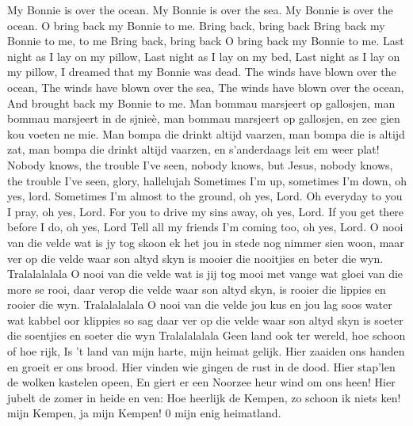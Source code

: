 \documentclass{article}
\begin{document}
\begin{songs}{}
\endsong 
{}
\beginverse*
My Bonnie is over the ocean.
My Bonnie is over the sea.
My Bonnie is over the ocean.
O bring back my Bonnie to me.
\endverse
\beginchorus
Bring back, bring back
Bring back my Bonnie to me, to me
Bring back, bring back
O bring back my Bonnie to me.
\endchorus
\beginverse*
Last night as I lay on my pillow,
Last night as I lay on my bed,
Last night as I lay on my pillow,
I dreamed that my Bonnie was dead.
\endverse
\beginverse*
The winds have blown over the ocean,
The winds have blown over the sea,
The winds have blown over the ocean,
And brought back my Bonnie to me.
\endverse
\beginverse*
Man bommau marsjeert op gallosjen,
man bommau marsjeert in de sjnieè,
man  bommau marsjeert op gallosjen,
en zee gien kou voeten ne mie.
\endverse
\beginverse*
Man bompa die drinkt altijd vaarzen,
man bompa die is altijd zat, 
man bompa die drinkt altijd vaarzen,
en s’anderdaags leit em weer plat!
\endverse
\endsong 
{}
\beginverse*
Nobody knows, the trouble I’ve seen,
nobody knows, but Jesus,
nobody knows, the trouble I’ve seen,
glory, hallelujah
\endverse
\beginverse*
Sometimes I’m up, sometimes I’m down,
oh yes, lord.
Sometimes I’m almost to the ground,
oh yes, Lord.
\endverse
\beginverse*
Oh everyday to you I pray,
oh yes, Lord.
For you to drive my sins away, 
oh yes, Lord.
If you get there before I do,
oh yes, Lord
Tell all my friends I’m coming too,
oh yes, Lord.
\endverse
\endsong
{}
\beginverse*
O nooi van die velde wat is jy tog skoon
ek het jou in stede nog nimmer sien woon,
maar ver op die velde waar son altyd skyn
is mooier die nooitjies en beter die wyn. 
Tralalalalala
\endverse
\beginverse*
O nooi van die velde wat is jij tog mooi
met vange wat gloei van die more se rooi,
daar verop die velde waar son altyd skyn,
is rooier die lippies en rooier die wyn.
Tralalalalala
\endverse
\beginverse*
O nooi van die velde jou kus en jou lag
soos water wat kabbel oor klippies so sag
daar ver op die velde waar son altyd skyn
is soeter die soentjies en soeter die wyn
Tralalalalala
\endverse
\endsong
{}
\beginverse*
Geen land ook ter wereld, hoe schoon of hoe rijk,
Is 't land van mijn harte, mijn heimat gelijk.
Hier zaaiden ons handen en groeit er ons brood.
Hier vinden wie gingen de rust in de dood.
Hier stap'len de wolken kastelen opeen,
En giert er een Noorzee heur wind om ons heen!
Hier jubelt de zomer in heide en ven:
Hoe heerlijk de Kempen, zo schoon ik niets ken!
\endverse
{} mijn Kempen, ja mijn Kempen!
0 mijn enig heimatland.

\end{songs}
\end{document}
